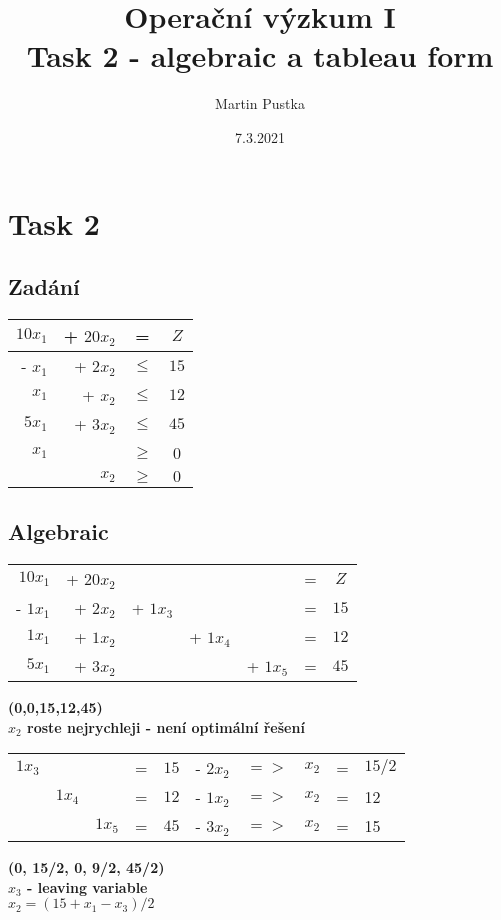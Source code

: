 \documentclass{article}%
\title{Operační výzkum I\\
    \large Task 2 - algebraic a tableau form}
\date{7.3.2021}
\author{Martin Pustka}
\begin{document}
\maketitle
\newpage

\section{Task 2}

\subsection{Zadání}
\begin{tabular}{rrcc}
    $10x_1$     & + $20x_2$  & =      & $Z$   \\
    \midrule
    - $x_1$     & + $2x_2$   & $\leq$ & $15$  \\
    $x_1$       & + $x_2$    & $\leq$ & $12$  \\
    $5x_1$      & + $3x_2$   & $\leq$ & $45$  \\
    \midrule
    $x_1$ &  & $\geq$ & 0 \\
    &  $x_2$ & $\geq$ & $0$ \\
\end{tabular}

\newpage
\subsection{Algebraic}

\begin{tabular}{rrrrrcc}
    $10x_1$   & + $20x_2$  &          &          &          & = & $Z$   \\
    - $1x_1$  & + $2x_2$   & + $1x_3$ &          &          & = & $15$  \\
    $1x_1$    & + $1x_2$   &          & + $1x_4$ &          & = & $12$  \\
    $5x_1$    & + $3x_2$   &          &          & + $1x_5$ & = & $45$  \\
\end{tabular}
\newline
\textbf{
    (0,0,15,12,45) \\
    $x_2$ roste nejrychleji - není optimální řešení\\
}

\begin{tabular}{rrrcclrrcl}
    $1x_3$ & & & =   & $15$ & - $2x_2$ & $=>$ & $x_2$ & = & $15/2$ \\
    & $1x_4$ & & =   & $12$ & - $1x_2$ & $=>$ & $x_2$ & = & 12 \\
    & & $1x_5$ & =   & $45$ & - $3x_2$ & $=>$ & $x_2$ & = & 15 \\
\end{tabular}
\newline
\textbf{
    (0, 15/2, 0, 9/2, 45/2) \\
    $x_3$ - leaving variable \\
    $x_2 = (15 + x_1 - x_3)/2$ \\
}
\end{document}
